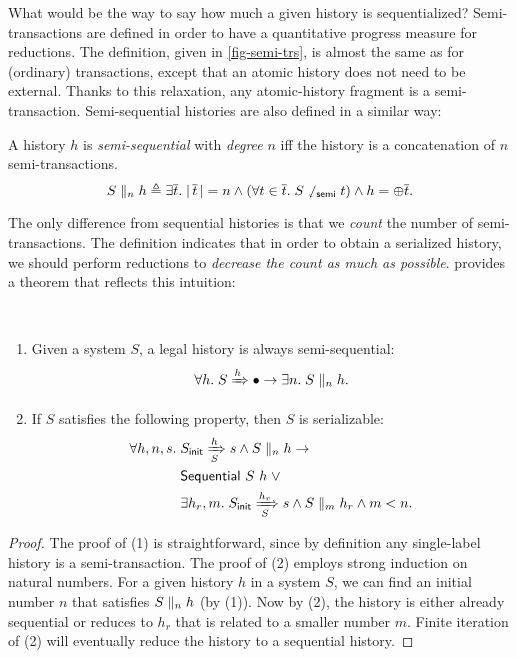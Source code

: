 \documentclass[sigplan,10pt,review,anonymous,screen]{acmart}\settopmatter{printfolios=true,printccs=false,printacmref=false}
\begin{document}
What would be the way to say how much a given history is sequentialized?
Semi-transactions are defined in order to have a quantitative progress measure for reductions.
The definition, given in \autoref{fig-semi-trs}, is almost the same as for (ordinary) transactions, except that an atomic history does not need to be external.
Thanks to this relaxation, any atomic-history fragment is a semi-transaction.
Semi-sequential histories are also defined in a similar way:
\begin{definition}
  A history $h$ is \emph{semi-sequential} with \emph{degree} $n$ iff the history
  is a concatenation of $n$ semi-transactions.
  \begin{displaymath}
    \hsseq{S}{h}{n} \triangleq \exists \listof{t}.\; \sizeof{\listof{t}} = n \wedge (\forall t \in \listof{t}.\; \strsn{S}{t}) \wedge h = \listconcat{\listof{t}}.
  \end{displaymath}
\end{definition}

The only difference from sequential histories is that we \emph{count} the number of semi-transactions.
The definition indicates that in order to obtain a serialized history, we should perform reductions to \emph{decrease the count as much as possible}.
\hemiola{} provides a theorem that reflects this intuition:
\begin{theorem}\label{thm-sseq-sz}\mbox{}\\
  \begin{enumerate}[leftmargin=*]
  \item Given a system $S$, a legal history is always semi-sequential:
    \begin{displaymath}
      \forall h.\; \semleg{S}{h} \to \exists n.\; \hsseq{S}{h}{n}.
    \end{displaymath}
  \item If $S$ satisfies the following property, then $S$ is serializable:
    \begin{align*}
      \forall h, n, s.\; & \semsteps{S}{\sysInit{S}}{h}{s} \land \hsseq{S}{h}{n} \to \\
      & \hseq{S}{h}\; \vee\\
      & \exists h_r, m.\; \semsteps{S}{\sysInit{S}}{h_r}{s} \wedge \hsseq{S}{h_r}{m} \wedge m < n.
    \end{align*}
  \end{enumerate}
\end{theorem}
\begin{proof}
  The proof of (1) is straightforward, since by definition any single-label history is a semi-transaction.
  The proof of (2) employs strong induction on natural numbers.
  For a given history $h$ in a system $S$, we can find an initial number $n$ that satisfies $\hsseq{S}{h}{n}$ (by (1)).
  Now by (2), the history is either already sequential or reduces to $h_r$ that is related to a smaller number $m$.
  Finite iteration of (2) will eventually reduce the history to a sequential history.
\end{proof}
\end{document}
